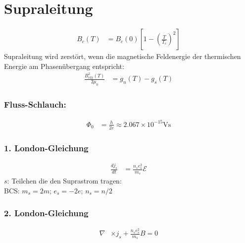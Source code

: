 \pagebreak
\section{Supraleitung}

\begin{equation*}
    \begin{aligned}
        B_c(T) &= B_c(0) \left[1- \left(\frac{T}{T_c}\right)^2\right]
    \end{aligned}
\end{equation*}
Supraleitung wird zerstört, wenn die magnetische Feldenergie der thermischen 
Energie am Phasenübergang entspricht:
\begin{equation*}
    \begin{aligned}
        \frac{B_{cth}^2(T)}{2 \mu_0} &= g_n(T) - g_s(T)
    \end{aligned}
\end{equation*}

\subsubsection*{Fluss-Schlauch:}
\begin{equation*}
    \begin{aligned}
        \Phi_0 &= \frac{h}{2e} \approx 2.067 \times 10^{-15} \text{Vs}
    \end{aligned}
\end{equation*}

\subsubsection*{1. London-Gleichung}
\begin{equation*}
    \begin{aligned}
        \frac{dj_s}{dt} &= \frac{n_s e_s^2}{m_s} \mathcal{E}
    \end{aligned}
\end{equation*}
$s$: Teilchen die den Suprastrom tragen:\\
BCS: $m_s = 2m$; $e_s = -2e$; $n_s = n/2$

\subsubsection*{2. London-Gleichung}
\begin{equation*}
    \begin{aligned}
        \nabla &\times j_s + \frac{n_s e_s^2}{m_s} B = 0
    \end{aligned}
\end{equation*}

